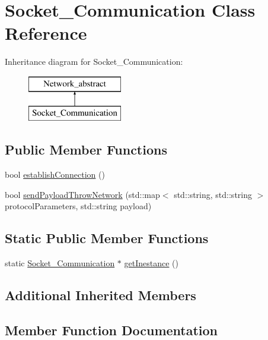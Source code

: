 \hypertarget{class_socket___communication}{}\section{Socket\+\_\+\+Communication Class Reference}
\label{class_socket___communication}
Inheritance diagram for Socket\+\_\+\+Communication\+:\begin{figure}[H]
\begin{center}
\leavevmode
\includegraphics[height=2.000000cm]{class_socket___communication}
\end{center}
\end{figure}
\subsection*{Public Member Functions}
\begin{DoxyCompactItemize}
\item 
bool \mbox{\hyperlink{class_socket___communication_a238f29a5a991144d97caeabeadb34a93}{establish\+Connection}} ()
\item 
bool \mbox{\hyperlink{class_socket___communication_a7004e7ba47e3d78f2c497329b869d864}{send\+Payload\+Throw\+Network}} (std\+::map$<$ std\+::string, std\+::string $>$ protocol\+Parameters, std\+::string payload)
\end{DoxyCompactItemize}
\subsection*{Static Public Member Functions}
\begin{DoxyCompactItemize}
\item 
static \mbox{\hyperlink{class_socket___communication}{Socket\+\_\+\+Communication}} $\ast$ \mbox{\hyperlink{class_socket___communication_a7e156c8010a798636b637262adb1e38f}{get\+Inestance}} ()
\end{DoxyCompactItemize}
\subsection*{Additional Inherited Members}


\subsection{Member Function Documentation}
\mbox{\label{class_socket___communication_a238f29a5a991144d97caeabeadb34a93}} 
